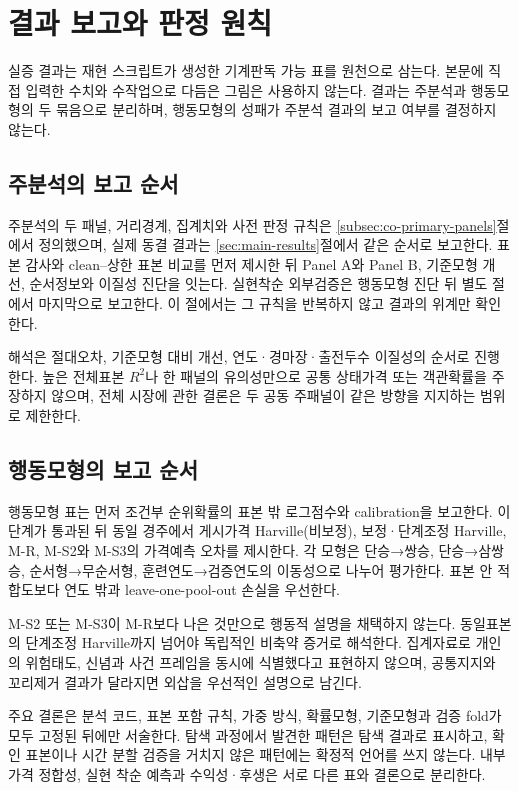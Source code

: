 \section{결과 보고와 판정 원칙}

실증 결과는 재현 스크립트가 생성한 기계판독 가능 표를 원천으로 삼는다. 본문에
직접 입력한 수치와 수작업으로 다듬은 그림은 사용하지 않는다. 결과는 주분석과
행동모형의 두 묶음으로 분리하며, 행동모형의 성패가 주분석 결과의 보고 여부를
결정하지 않는다.

\subsection{주분석의 보고 순서}

주분석의 두 패널, 거리경계, 집계치와 사전 판정 규칙은
\ref{subsec:co-primary-panels}절에서 정의했으며, 실제 동결 결과는
\ref{sec:main-results}절에서 같은 순서로 보고한다. 표본 감사와 clean--상한
표본 비교를 먼저 제시한 뒤 Panel A와 Panel B, 기준모형 개선, 순서정보와
이질성 진단을 잇는다. 실현착순 외부검증은 행동모형 진단 뒤 별도 절에서
마지막으로 보고한다. 이 절에서는 그 규칙을 반복하지 않고 결과의 위계만 확인한다.

해석은 절대오차, 기준모형 대비 개선, 연도·경마장·출전두수 이질성의 순서로
진행한다. 높은 전체표본 $R^2$나 한 패널의 유의성만으로 공통 상태가격 또는
객관확률을 주장하지 않으며, 전체 시장에 관한 결론은 두 공동 주패널이 같은
방향을 지지하는 범위로 제한한다.

\subsection{행동모형의 보고 순서}

행동모형 표는 먼저 조건부 순위확률의 표본 밖 로그점수와 calibration을
보고한다. 이 단계가 통과된 뒤 동일 경주에서 게시가격 Harville(비보정),
보정·단계조정 Harville,
M-R, M-S2와 M-S3의 가격예측 오차를 제시한다. 각 모형은 단승→쌍승,
단승→삼쌍승, 순서형→무순서형,
훈련연도→검증연도의 이동성으로 나누어 평가한다. 표본 안 적합도보다 연도 밖과
leave-one-pool-out 손실을 우선한다.

M-S2 또는 M-S3이 M-R보다 나은 것만으로 행동적 설명을 채택하지 않는다.
동일표본의 단계조정 Harville까지 넘어야 독립적인 비축약 증거로 해석한다.
집계자료로 개인의 위험태도, 신념과 사건 프레임을 동시에 식별했다고 표현하지
않으며, 공통지지와 꼬리제거 결과가 달라지면 외삽을 우선적인 설명으로 남긴다.

주요 결론은 분석 코드, 표본 포함 규칙, 가중 방식, 확률모형, 기준모형과
검증 fold가 모두 고정된 뒤에만 서술한다. 탐색 과정에서 발견한 패턴은 탐색
결과로 표시하고, 확인 표본이나 시간 분할 검증을 거치지 않은 패턴에는 확정적
언어를 쓰지 않는다. 내부 가격 정합성, 실현 착순 예측과 수익성·후생은 서로
다른 표와 결론으로 분리한다.
